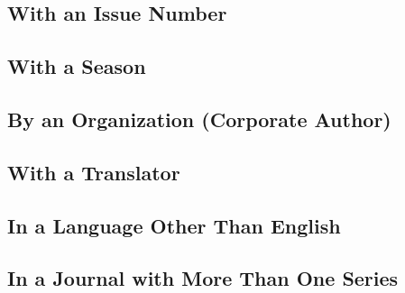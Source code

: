 \documentclass{article}
\begin{document}
\subsection{With an Issue Number} %
\label{sub:with_an_issue_number}
\begin{refsection}
	\nocite{Kafka:2007tm}
	\printbibliography[heading=none]
\end{refsection}
\subsection{With a Season} %
\label{sub:with_a_season}
\begin{refsection}
	\nocite{Belton:2008uo}
	\printbibliography[heading=none]
\end{refsection}
\subsection{By an Organization (Corporate Author)} %
\label{sub:by_an_organization_corporate_author}
\begin{refsection}
	\nocite{MLA-Ad-Hoc:2007tc}
	\printbibliography[heading=none]
\end{refsection}
\subsection{With a Translator} %
\label{sub:with_a_translator}
\begin{refsection}
	\nocite{Tibullus:2002ub}
	\printbibliography[heading=none]
\end{refsection}
\subsection{In a Language Other Than English} %
\label{sub:in_a_language_other_than_english}
\begin{refsection}
	\nocite{Litvak:2006vi}
	\printbibliography[heading=none]
\end{refsection}
\subsection{In a Journal with More Than One Series} %
\label{sub:in_a_journal_with_more_than_one_series}
\begin{refsection}
	\nocite{Helmling:2006ug}
	\printbibliography[heading=none]
\end{refsection}
\end{document}
